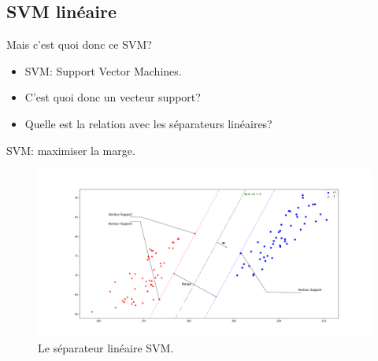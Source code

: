 \documentclass[8pt]{beamer}
\begin{document}
	\subsection[linear]{SVM linéaire}
		\begin{frame}{Mais c'est quoi donc ce SVM?}
			\begin{itemize}
				\item  SVM\@: Support Vector Machines.
				\item  C'est quoi donc un vecteur support?
				\item  Quelle est la relation avec les séparateurs linéaires?
			\end{itemize}
		\end{frame}

		\begin{frame}{SVM\@: maximiser la marge.}
			\begin{figure}[H]
				\includegraphics[width=\textwidth]{images/samples/svm}
				\caption{ Le séparateur linéaire SVM.}
			\end{figure}
		\end{frame}
\end{document}
